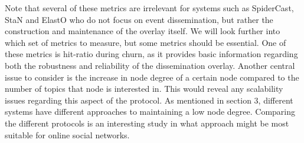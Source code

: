     Note that several of these metrics are irrelevant for systems such
    as SpiderCast, StaN and ElastO who do not focus on event dissemination, but
    rather the construction and maintenance of the overlay itself.  We
    will look further into which set of metrics to measure, but some
    metrics should be essential. One of these metrics is hit-ratio
    during churn, as it provides basic information regarding both the
    robustness and reliability of the dissemination overlay. Another
    central issue to consider is the increase in node degree of a
    certain node compared to the number of topics that node is
    interested in. This would reveal any scalability issues regarding
    this aspect of the protocol. As mentioned in section 3, different
    systems have different approaches to maintaining a low node degree.
    Comparing the different protocols is an interesting study in what approach
    might be most suitable for online social networks.
